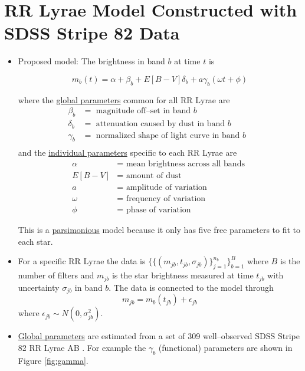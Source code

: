 \documentclass[a0,portrait]{a0poster}
\begin{document}
\begin{multicols}{2}
\begin{itemize}
\end{itemize}


\section*{RR Lyrae Model Constructed with SDSS Stripe 82 Data}

\begin{itemize}
\item Proposed model: The brightness in band $b$ at time $t$ is

{\Large
\begin{equation*}
m_b(t) = \alpha + \beta_b + E[B-V]\delta_b + a\gamma_b(\omega t + \phi)
\end{equation*}
}

where the \underline{global parameters} common for all RR Lyrae are
\begin{align*}
\beta_b &=  \text{ magnitude off--set in band $b$ }\\
\delta_b &= \text{ attenuation caused by dust in band $b$ }\\
\gamma_b &= \text{ normalized shape of light curve in band $b$ }\\
\end{align*}
and the \underline{individual parameters} specific to each RR Lyrae are
\begin{align*}
\alpha &= \text{ mean brightness across all bands }\\
E[B-V] &= \text{ amount of dust }\\
a &= \text{ amplitude of variation }\\
\omega &= \text{ frequency of variation }\\
\phi &= \text{ phase of variation }
\end{align*}

This is a \underline{parsimonious} model because it only has five free parameters to fit to each star.

\item For a specific RR Lyrae the data is $\{\{(m_{jb},t_{jb},\sigma_{jb})\}_{j=1}^{n_b}\}_{b=1}^B$ where $B$ is the number of filters and $m_{jb}$ is the star brightness measured at time $t_{jb}$ with uncertainty $\sigma_{jb}$ in band $b$. The data is connected to the model through
\begin{equation*}
m_{jb} = m_b(t_{jb}) + \epsilon_{jb}
\end{equation*}
where $\epsilon_{jb} \sim N(0,\sigma_{jb}^2)$. 

\item \underline{Global parameters} are estimated from a set of 309 well--observed SDSS Stripe 82 RR Lyrae AB \cite{sesar2010light}. For example the $\gamma_b$ (functional) parameters are shown in Figure \ref{fig:gamma}. 


\end{itemize}
\end{multicols}
\end{document}
